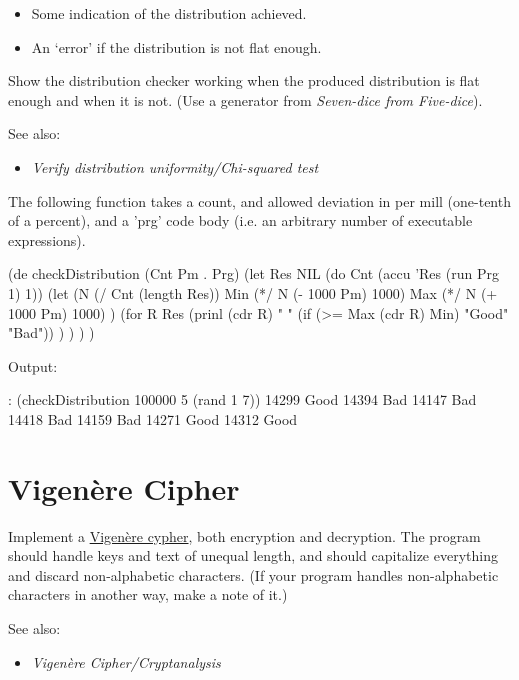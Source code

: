 \begin{itemize}
\item
  Some indication of the distribution achieved.
\item
  An `error' if the distribution is not flat enough.
\end{itemize}

Show the distribution checker working when the produced distribution is
flat enough and when it is not. (Use a generator from
\emph{Seven-dice from Five-dice}).

See also:

\begin{itemize}
\item
  \emph{Verify
  distribution uniformity/Chi-squared test}
\end{itemize}


\begin{wideverbatim}

The following function takes a count, and allowed deviation in per mill
(one-tenth of a percent), and a 'prg' code body (i.e. an arbitrary number of
executable expressions).

(de checkDistribution (Cnt Pm . Prg)
   (let Res NIL
      (do Cnt (accu 'Res (run Prg 1) 1))
      (let
         (N (/ Cnt (length Res))
            Min (*/ N (- 1000 Pm) 1000)
            Max (*/ N (+ 1000 Pm) 1000) )
         (for R Res
            (prinl (cdr R) " " (if (>= Max (cdr R) Min) "Good" "Bad")) ) ) ) )

Output:

: (checkDistribution 100000 5 (rand 1 7))
14299 Good
14394 Bad
14147 Bad
14418 Bad
14159 Bad
14271 Good
14312 Good

\end{wideverbatim}

\pagebreak{}
\section*{Vigenère Cipher}

Implement a
\href{http://en.wikipedia.org/wiki/Vigen\%C3\%A8re\_cipher}{Vigenère
  cypher}, both encryption and decryption. The program should handle
keys and text of unequal length, and should capitalize everything and
discard non-alphabetic characters. (If your program handles
non-alphabetic characters in another way, make a note of it.)

See also:

\begin{itemize}
\item \emph{Vigenère Cipher/Cryptanalysis}
\end{itemize}



